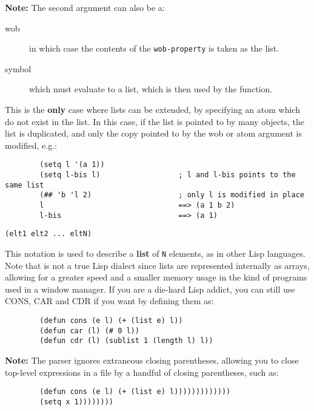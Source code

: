{\bf Note:} The second argument can also be a:
\begin{description}
\item[wob] in which case the contents of the \verb"wob-property" is taken
as the list.
\item[symbol] which must evaluate to a list, which is then used by the
function.
\end{description}
This is the {\bf only} case where lists can be extended, by specifying 
an atom which do not exist in the list. In this case, if the list is pointed
to by many objects, the list is duplicated, and only the copy pointed to by
the wob or atom argument is modified, e.g.:

{\exemplefont\begin{verbatim}
        (setq l '(a 1))
        (setq l-bis l)                  ; l and l-bis points to the same list
        (## 'b 'l 2)                    ; only l is modified in place
        l                               ==> (a 1 b 2)
        l-bis                           ==> (a 1)
\end{verbatim}}


{\usagefont\begin{verbatim}
(elt1 elt2 ... eltN)
\end{verbatim}}\usageupspace

This notation is used to describe a {\bf list} of {\tt N} elements, as in
other Lisp languages. Note that {\WOOL} is not a true Lisp dialect since lists
are represented internally as arrays, allowing for a greater speed and a
smaller memory usage in the kind of programs used in a window manager. If
you are a die-hard Lisp addict, you can still use CONS, CAR and CDR
if you want by defining them as:

{\exemplefont\begin{verbatim}
        (defun cons (e l) (+ (list e) l))
        (defun car (l) (# 0 l))
        (defun cdr (l) (sublist 1 (length l) l))
\end{verbatim}}

{\bf Note:} The {\WOOL} parser ignores extraneous closing parentheses,
allowing you to close top-level expressions in a file by a handful of
closing parentheses, such as:

{\exemplefont\begin{verbatim}
        (defun cons (e l) (+ (list e) l)))))))))))))
        (setq x 1))))))))
\end{verbatim}}

